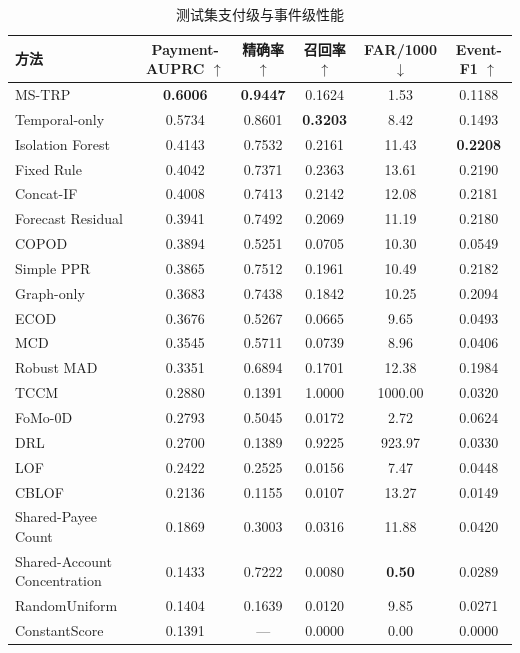 \documentclass[a4paper,fleqn]{cas-dc}
\begin{document}
\begin{table}[pos=tbp]
\small
\caption{测试集支付级与事件级性能}
\begin{tabular*}{\tblwidth}{@{\extracolsep{\fill}}lccccc@{}}
\toprule
方法 & Payment-AUPRC $\uparrow$ & 精确率 $\uparrow$ & 召回率 $\uparrow$ & FAR/1000 $\downarrow$ & Event-F1 $\uparrow$ \\
\midrule
MS-TRP & \textbf{0.6006} & \textbf{0.9447} & 0.1624 & 1.53 & 0.1188 \\
Temporal-only & 0.5734 & 0.8601 & \textbf{0.3203} & 8.42 & 0.1493 \\
Isolation Forest\cite{ref2} & 0.4143 & 0.7532 & 0.2161 & 11.43 & \textbf{0.2208} \\
Fixed Rule & 0.4042 & 0.7371 & 0.2363 & 13.61 & 0.2190 \\
Concat-IF\cite{ref2} & 0.4008 & 0.7413 & 0.2142 & 12.08 & 0.2181 \\
Forecast Residual & 0.3941 & 0.7492 & 0.2069 & 11.19 & 0.2180 \\
COPOD\cite{ref14} & 0.3894 & 0.5251 & 0.0705 & 10.30 & 0.0549 \\
Simple PPR\cite{ref29} & 0.3865 & 0.7512 & 0.1961 & 10.49 & 0.2182 \\
Graph-only & 0.3683 & 0.7438 & 0.1842 & 10.25 & 0.2094 \\
ECOD\cite{ref13} & 0.3676 & 0.5267 & 0.0665 & 9.65 & 0.0493 \\
MCD\cite{ref4} & 0.3545 & 0.5711 & 0.0739 & 8.96 & 0.0406 \\
Robust MAD & 0.3351 & 0.6894 & 0.1701 & 12.38 & 0.1984 \\
TCCM\cite{ref40} & 0.2880 & 0.1391 & 1.0000 & 1000.00 & 0.0320 \\
FoMo-0D\cite{ref39} & 0.2793 & 0.5045 & 0.0172 & 2.72 & 0.0624 \\
DRL\cite{ref38} & 0.2700 & 0.1389 & 0.9225 & 923.97 & 0.0330 \\
LOF\cite{ref3} & 0.2422 & 0.2525 & 0.0156 & 7.47 & 0.0448 \\
CBLOF\cite{ref5} & 0.2136 & 0.1155 & 0.0107 & 13.27 & 0.0149 \\
Shared-Payee Count & 0.1869 & 0.3003 & 0.0316 & 11.88 & 0.0420 \\
Shared-Account Concentration & 0.1433 & 0.7222 & 0.0080 & \textbf{0.50} & 0.0289 \\
RandomUniform & 0.1404 & 0.1639 & 0.0120 & 9.85 & 0.0271 \\
ConstantScore & 0.1391 & — & 0.0000 & 0.00 & 0.0000 \\
\bottomrule
\end{tabular*}


\end{table}
\end{document}
